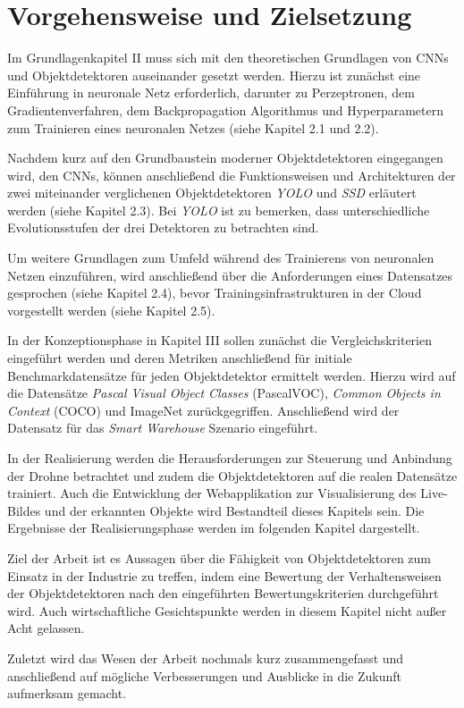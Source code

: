 \section{Vorgehensweise und Zielsetzung}

Im Grundlagenkapitel II muss sich mit den theoretischen Grundlagen von CNNs und Objektdetektoren auseinander gesetzt werden. Hierzu ist zunächst eine Einführung in neuronale Netz erforderlich, darunter zu Perzeptronen, dem Gradientenverfahren, dem Backpropagation Algorithmus und Hyperparametern zum Trainieren eines neuronalen Netzes (siehe Kapitel 2.1 und 2.2). 

Nachdem kurz auf den Grundbaustein moderner Objektdetektoren eingegangen wird, den CNNs, können anschließend die Funktionsweisen und Architekturen der zwei miteinander verglichenen Objektdetektoren \textit{YOLO} und \textit{SSD} erläutert werden (siehe Kapitel 2.3). Bei \textit{YOLO} ist zu bemerken, dass unterschiedliche Evolutionsstufen der drei Detektoren zu betrachten sind.

Um weitere Grundlagen zum Umfeld während des Trainierens von neuronalen Netzen einzuführen, wird anschließend über die Anforderungen eines Datensatzes gesprochen (siehe Kapitel 2.4), bevor Trainingsinfrastrukturen in der Cloud vorgestellt werden (siehe Kapitel 2.5). 

In der Konzeptionsphase in Kapitel III sollen zunächst die Vergleichskriterien eingeführt werden und deren Metriken anschließend für initiale Benchmarkdatensätze für jeden Objektdetektor ermittelt werden. Hierzu wird auf die Datensätze \textit{Pascal Visual Object Classes} (PascalVOC), \textit{Common Objects in Context} (COCO) und ImageNet zurückgegriffen. Anschließend wird der Datensatz für das \textit{Smart Warehouse} Szenario eingeführt. 

In der Realisierung werden die Herausforderungen zur Steuerung und Anbindung der Drohne betrachtet und zudem die Objektdetektoren auf die realen Datensätze trainiert. Auch die Entwicklung der Webapplikation zur Visualisierung des Live-Bildes und der erkannten Objekte wird Bestandteil dieses Kapitels sein. Die Ergebnisse der Realisierungsphase werden im folgenden Kapitel dargestellt. 

Ziel der Arbeit ist es Aussagen über die Fähigkeit von Objektdetektoren zum Einsatz in der Industrie zu treffen, indem eine Bewertung der Verhaltensweisen der Objektdetektoren nach den eingeführten Bewertungskriterien durchgeführt wird. Auch wirtschaftliche Gesichtspunkte werden in diesem Kapitel nicht außer Acht gelassen. 

Zuletzt wird das Wesen der Arbeit nochmals kurz zusammengefasst und anschließend auf mögliche Verbesserungen und Ausblicke in die Zukunft aufmerksam gemacht. 
